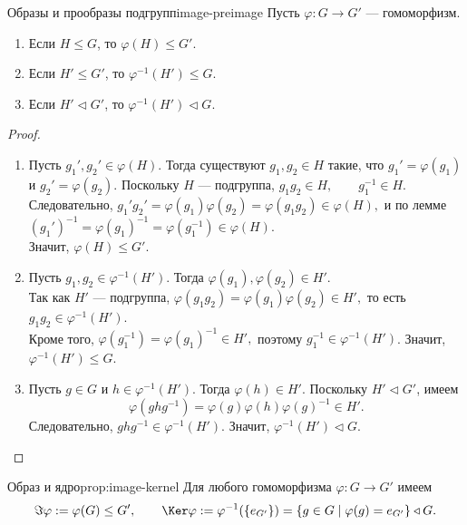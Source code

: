 \begin{Proposition}{Образы и прообразы подгрупп}{image-preimage}
	Пусть $\varphi\colon G\to G'$ --- гомоморфизм.
	\begin{enumerate}
		\item Если $H\le G$, то $\varphi(H)\le G'$.
		\item Если $H'\le G'$, то $\varphi^{-1}(H')\le G$.
		\item Если $H'\triangleleft G'$, то $\varphi^{-1}(H')\triangleleft G$.
	\end{enumerate}
\end{Proposition}

\begin{proof}
	\begin{enumerate}
		\item Пусть $g_1',g_2'\in \varphi(H)$. Тогда существуют $g_1,g_2\in H$ такие, что $g_1'=\varphi(g_1)$ и $g_2'=\varphi(g_2)$. Поскольку $H$ --- подгруппа, $g_1g_2\in H, \qquad g_1^{-1}\in H.$\\
		Следовательно, $g_1'g_2' = \varphi(g_1)\varphi(g_2)=\varphi(g_1g_2)\in \varphi(H),$ и по лемме $(g_1')^{-1}=\varphi(g_1)^{-1}=\varphi(g_1^{-1})\in \varphi(H).$\\
		Значит, $\varphi(H)\le G'$.
		\item Пусть $g_1,g_2\in \varphi^{-1}(H')$. Тогда $\varphi(g_1),\varphi(g_2)\in H'$.\\
		Так как $H'$ --- подгруппа, $\varphi(g_1g_2)=\varphi(g_1)\varphi(g_2)\in H',$ то есть $g_1g_2\in \varphi^{-1}(H')$.\\
		Кроме того, $\varphi(g_1^{-1})=\varphi(g_1)^{-1}\in H',$ поэтому $g_1^{-1}\in \varphi^{-1}(H')$. Значит, $\varphi^{-1}(H')\le G$.

		\item Пусть $g\in G$ и $h\in \varphi^{-1}(H')$. Тогда $\varphi(h)\in H'$. Поскольку $H'\triangleleft G'$, имеем
		\[
		\varphi(ghg^{-1})=\varphi(g)\varphi(h)\varphi(g)^{-1}\in H'.
		\]
		Следовательно, $ghg^{-1}\in \varphi^{-1}(H')$. Значит, $\varphi^{-1}(H')\triangleleft G$.
	\end{enumerate}
\end{proof}

\begin{Corollary}{Образ и ядро}{prop:image-kernel}
	Для любого гомоморфизма $\varphi\colon G\to G'$ имеем
	\[
	\Im \varphi := \varphi(G) \le G',
	\qquad
	\Ker \varphi := \varphi^{-1}(\{e_{G'}\}) = \{g\in G \mid \varphi(g)=e_{G'}\} \triangleleft G.
	\]
\end{Corollary}

